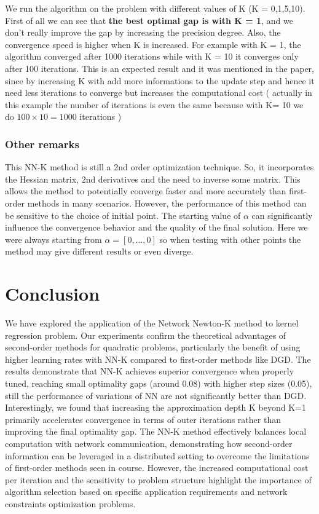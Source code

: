 \documentclass[10pt,english]{article}
\begin{document}
We run the algorithm on the problem with different values of K (K = 0,1,5,10). First of all we can see that \textbf{the best optimal gap is with K = 1}, and we don't really improve the gap by increasing the precision degree. Also, the convergence speed is higher when K is increased. For example with K = 1, the algorithm converged after 1000 iterations while with K = 10 it converges only after 100 iterations. This is an expected result and it was mentioned in the paper, since by increasing K with add more informations to the update step and hence it need less iterations to converge but increases the computational cost ( actually in this example the number of iterations is even the same because with K= 10 we do $100\times 10 = 1000$ iterations )


\subsubsection{Other remarks}

This NN-K method is still a 2nd order optimization technique. So, it incorporates the Hessian matrix, 2nd derivatives and the need to inverse some matrix. This allows the method to potentially converge faster and more accurately than first-order methods in many scenarios. However, the performance of this method can be sensitive to the choice of initial point. The starting value of $\alpha$ can significantly influence the convergence behavior and the quality of the final solution. Here we were always starting from $\alpha = [0, \dots, 0]$ so when testing with other points the method may give different results or even diverge.

\section{Conclusion}


We have explored the application of the Network Newton-K method to kernel regression problem. Our experiments confirm the theoretical advantages of second-order methods for quadratic problems, particularly the benefit of using higher learning rates with NN-K compared to first-order methods like DGD. The results demonstrate that NN-K achieves superior convergence when properly tuned, reaching small optimality gaps (around 0.08) with higher step sizes (0.05), still the performance of variations of NN are not significantly better than DGD. Interestingly, we found that increasing the approximation depth K beyond K=1 primarily accelerates convergence in terms of outer iterations rather than improving the final optimality gap.  The NN-K method effectively balances local computation with network communication, demonstrating how second-order information can be leveraged in a distributed setting to overcome the limitations of first-order methods seen in course. However, the increased computational cost per iteration and the sensitivity to problem structure highlight the importance of algorithm selection based on specific application requirements and network constraints optimization problems.
\end{document}
